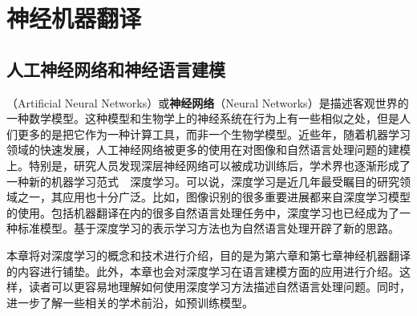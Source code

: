 
%

\part{神经机器翻译}

\renewcommand\figurename{图}%
\renewcommand\tablename{表}%


\chapter{人工神经网络和神经语言建模}

（Artificial Neural Networks）或{\small\sffamily\bfseries{神经网络}}（Neural Networks）是描述客观世界的一种数学模型。这种模型和生物学上的神经系统在行为上有一些相似之处，但是人们更多的是把它作为一种计算工具，而非一个生物学模型。近些年，随着机器学习领域的快速发展，人工神经网络被更多的使用在对图像和自然语言处理问题的建模上。特别是，研究人员发现深层神经网络可以被成功训练后，学术界也逐渐形成了一种新的机器学习范式\ \dash \ 深度学习。可以说，深度学习是近几年最受瞩目的研究领域之一，其应用也十分广泛。比如，图像识别的很多重要进展都来自深度学习模型的使用。包括机器翻译在内的很多自然语言处理任务中，深度学习也已经成为了一种标准模型。基于深度学习的表示学习方法也为自然语言处理开辟了新的思路。

\parinterval 本章将对深度学习的概念和技术进行介绍，目的是为第六章和第七章神经机器翻译的内容进行铺垫。此外，本章也会对深度学习在语言建模方面的应用进行介绍。这样，读者可以更容易地理解如何使用深度学习方法描述自然语言处理问题。同时，进一步了解一些相关的学术前沿，如预训练模型。\\ \\ \\

